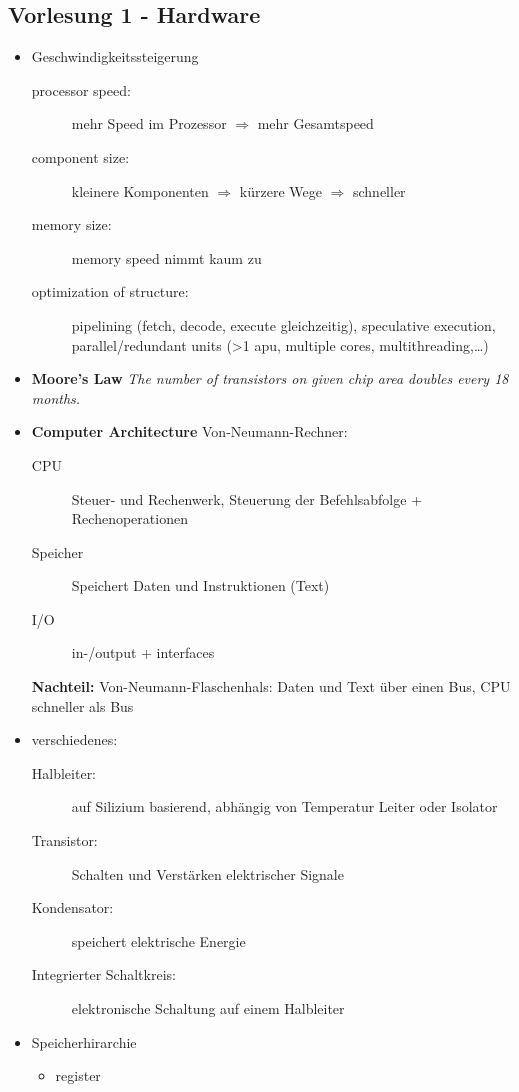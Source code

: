 \subsection*{Vorlesung 1 - Hardware}
 \begin{itemize}
 \item Geschwindigkeitssteigerung
  \begin{description}
   \item[processor speed:] mehr Speed im Prozessor $\Rightarrow$ mehr Gesamtspeed
   \item[component size:] kleinere Komponenten $\Rightarrow$ kürzere Wege $\Rightarrow$ schneller
   \item[memory size:] memory speed nimmt kaum zu
   \item[optimization of structure:] pipelining (fetch, decode, execute gleichzeitig), speculative execution, parallel/redundant units (>1 apu, multiple cores, multithreading,\dots)
  \end{description}
  \item \textbf{Moore's Law} \emph{The number of transistors on given chip area doubles every 18 months.}
  \item \textbf{Computer Architecture} Von-Neumann-Rechner:
   \begin{description}
    \item[CPU] Steuer- und Rechenwerk, Steuerung der Befehlsabfolge + Rechenoperationen
    \item[Speicher] Speichert Daten und Instruktionen (Text)
    \item[I/O] in-/output + interfaces
   \end{description}
   \textbf{Nachteil:} Von-Neumann-Flaschenhals: Daten und Text über einen Bus, CPU schneller als Bus
   \item verschiedenes:
    \begin{description}
     \item[Halbleiter:] auf Silizium basierend, abhängig von Temperatur Leiter oder Isolator
     \item[Transistor:] Schalten und Verstärken elektrischer Signale
     \item[Kondensator:] speichert elektrische Energie
     \item[Integrierter Schaltkreis:] elektronische Schaltung auf einem Halbleiter
    \end{description}
   \item Speicherhirarchie
    \begin{itemize}
     \item register 

\end{itemize}
\end{itemize}
